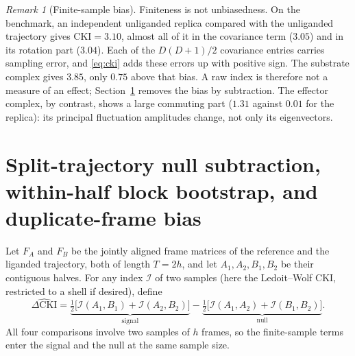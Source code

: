 \documentclass[11pt,reqno]{amsart}
\theoremstyle{plain}
\theoremstyle{definition}
\theoremstyle{remark}
\newtheorem{remark}[theorem]{Remark}
\numberwithin{equation}{section}
\newcommand{\DCKI}{\Delta\mathrm{CKI}}
\begin{document}
\begin{remark}[Finite-sample bias]
Finiteness is not unbiasedness. On the benchmark, an independent unliganded replica compared with the unliganded trajectory gives $\mathrm{CKI}=3.10$, almost all of it in the covariance term ($3.05$) and in its rotation part ($3.04$). Each of the $D(D+1)/2$ covariance entries carries sampling error, and \eqref{eq:cki} adds these errors up with positive sign. The substrate complex gives $3.85$, only $0.75$ above that bias. A raw index is therefore not a measure of an effect; Section~\ref{sec:null} removes the bias by subtraction. The effector complex, by contrast, shows a large commuting part ($1.31$ against $0.01$ for the replica): its principal fluctuation amplitudes change, not only its eigenvectors.
\end{remark}

\section{Split-trajectory null subtraction, within-half block bootstrap, and duplicate-frame bias}
\label{sec:null}

Let $F_A$ and $F_B$ be the jointly aligned frame matrices of the reference and the liganded trajectory, both of length $T=2h$, and let $A_1,A_2,B_1,B_2$ be their contiguous halves. For any index $\mathcal I$ of two samples (here the Ledoit--Wolf CKI, restricted to a shell if desired), define
\begin{equation}\label{eq:excess}
\widehat{\DCKI}=\underbrace{\tfrac12\bigl[\mathcal I(A_1,B_1)+\mathcal I(A_2,B_2)\bigr]}_{\text{signal}}-\underbrace{\tfrac12\bigl[\mathcal I(A_1,A_2)+\mathcal I(B_1,B_2)\bigr]}_{\text{null}} .
\end{equation}
All four comparisons involve two samples of $h$ frames, so the finite-sample terms enter the signal and the null at the same sample size.
\end{document}
